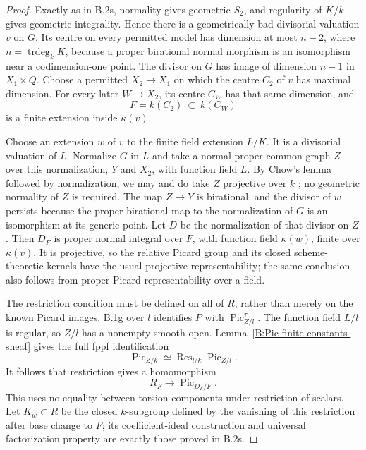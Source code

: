 \begin{proof}
Exactly as in B.2s, normality gives geometric $S_2$, and
regularity of $K/k$ gives geometric integrality.  Hence there
is a geometrically bad divisorial valuation $v$ on $G$.
Its centre on every permitted model has dimension at most
$n-2$, where $n=\operatorname{trdeg}_k K$, because a proper
birational normal morphism is an isomorphism near a
codimension-one point.  The divisor on $G$ has image of
dimension $n-1$ in $X_1\times Q$.
Choose a permitted $X_2\to X_1$ on which the centre $C_2$
of $v$ has maximal dimension.  For every later $W\to X_2$,
its centre $C_W$ has that same dimension, and
\[
                     F=k(C_2)\ \subset\ k(C_W)
\]
is a finite extension inside $\kappa(v)$.

Choose an extension $w$ of $v$ to the finite field extension
$L/K$.  It is a divisorial valuation of $L$.
Normalize $G$ in $L$ and take a normal proper common graph
$Z$ over this normalization, $Y$ and $X_2$, with function
field $L$.  By Chow's lemma followed by normalization, we
may and do take $Z$ projective over $k$
\cite[Tag 0200]{StacksB}; no geometric normality of $Z$ is
required.  The map $Z\to Y$ is birational, and the divisor
of $w$ persists because the proper birational map to the
normalization of $G$ is an isomorphism at its generic point.
Let $D$ be the normalization of that divisor on $Z$.
Then $D_F$ is proper normal integral over $F$, with function
field $\kappa(w)$, finite over $\kappa(v)$.
It is projective, so the relative Picard group and its closed
scheme-theoretic kernels have the usual projective
representability; the same conclusion also follows from
proper Picard representability over a field.

The restriction condition must be defined on all of $R$,
rather than merely on the known Picard images.  B.1g over
$l$ identifies $P$ with $\operatorname{Pic}^{\tau}_{Z/l}$.
The function field $L/l$ is regular, so $Z/l$ has a nonempty
smooth open.  Lemma~\ref{B:Pic-finite-constants-sheaf} gives
the full fppf identification
\[
 \operatorname{Pic}_{Z/k}
       \simeq\operatorname{Res}_{l/k}\operatorname{Pic}_{Z/l}.
\]
It follows that restriction gives a homomorphism
\[
                       R_F\longrightarrow\operatorname{Pic}_{D_F/F}.
\]
This uses no equality between torsion components under
restriction of scalars.  Let $K_w\subset R$ be the closed
$k$-subgroup defined by the vanishing of this restriction
after base change to $F$; its coefficient-ideal construction
and universal factorization property are exactly those
proved in B.2s.


\end{proof}
